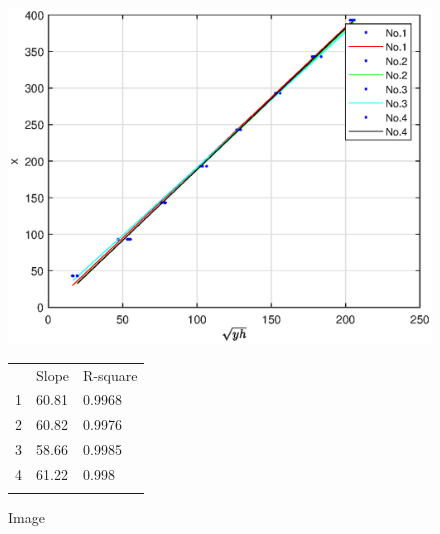 \begin{figure}

    \begin{minipage}[b]{0.6\textwidth}
        \centering
    \includegraphics[width=0.5\linewidth]{Results/1.eps}
    \caption{Image}
    \end{minipage}
    \begin{minipage}[t]{0.3\textwidth}
        \centering
        \begin{tabular}{l|ll} 
            \cline{1-3}
                                 & Slope & R-square     \\ 
            \cline{1-3}
            1                    & 60.81 & 0.9968       \\
            2                    & 60.82 & 0.9976       \\
            3                    & 58.66 & 0.9985       \\
            4                    & 61.22 & 0.998        \\ 
            \cline{1-3}
            \multicolumn{1}{l}{} &       &             
            \end{tabular}
        \label{fig:NormalSafe}
    \end{minipage}
    \end{figure}
    